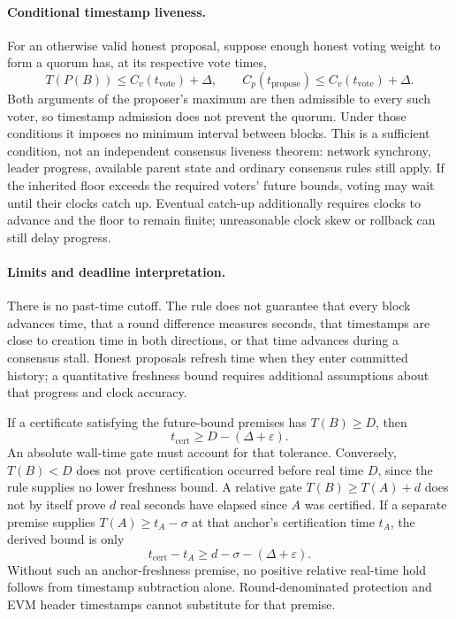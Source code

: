 \paragraph{Conditional timestamp liveness.}
For an otherwise valid honest proposal, suppose enough honest voting weight to
form a quorum has, at its respective vote times,
\[
 T(P(B))\leq C_v(t_{\mathrm{vote}})+\Delta, \qquad
 C_p(t_{\mathrm{propose}})\leq C_v(t_{\mathrm{vote}})+\Delta.
\]
Both arguments of the proposer's maximum are then admissible to every such
voter, so timestamp admission does not prevent the quorum. Under those
conditions it imposes no minimum interval between blocks. This is a sufficient
condition, not an independent consensus liveness theorem: network synchrony,
leader progress, available parent state and ordinary consensus rules still
apply. If the inherited floor exceeds the required voters' future bounds,
voting may wait until their clocks catch up. Eventual catch-up additionally
requires clocks to advance and the floor to remain finite; unreasonable clock
skew or rollback can still delay progress.

\paragraph{Limits and deadline interpretation.}
There is no past-time cutoff. The rule does not guarantee that every block
advances time, that a round difference measures seconds, that timestamps are
close to creation time in both directions, or that time advances during a
consensus stall. Honest proposals refresh time when they enter committed
history; a quantitative freshness bound requires additional assumptions about
that progress and clock accuracy.

If a certificate satisfying the future-bound premises has $T(B)\geq D$, then
\[
 t_{\mathrm{cert}}\geq D-(\Delta+\varepsilon).
\]
An absolute wall-time gate must account for that tolerance. Conversely,
$T(B)<D$ does not prove certification occurred before real time $D$, since the
rule supplies no lower freshness bound. A relative gate
$T(B)\geq T(A)+d$ does not by itself prove $d$ real seconds have elapsed since
$A$ was certified. If a separate premise supplies
$T(A)\geq t_A-\sigma$ at that anchor's certification time $t_A$, the derived
bound is only
\[
 t_{\mathrm{cert}}-t_A\geq d-\sigma-(\Delta+\varepsilon).
\]
Without such an anchor-freshness premise, no positive relative real-time hold
follows from timestamp subtraction alone. Round-denominated protection and EVM
header timestamps cannot substitute for that premise.

